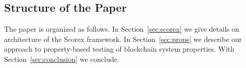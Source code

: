 

\subsection{Structure of the Paper}

The paper is organized as follows. In Section~\ref{sec:scorex} we give details on architecture of the Scorex framework. In Section~\ref{sec:props} we describe our approach to property-based testing of blockchain system properties. With Section~\ref{sec:conclusion} we conclude.